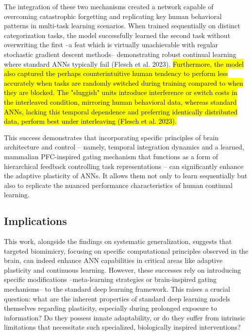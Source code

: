\documentclass[
10pt, %
a4paper, %
oneside, %
headinclude,footinclude, %
BCOR5mm, %
]{scrartcl}
\begin{document}
The integration of these two mechanisms created a network capable of overcoming catastrophic forgetting and replicating key human behavioral patterns in multi-task learning scenarios. When trained sequentially on distinct categorization tasks, the model successfully learned the second task without overwriting the first –a feat which is virtually unachievable with regular stochastic gradient descent methods– demonstrating robust continual learning where standard ANNs typically fail (Flesch et al. 2023). \hl{Furthermore, the model also captured the perhaps counterintuitive human tendency to perform less accurately when tasks are randomly switched during training compared to when they are blocked. The "sluggish" units introduce interference or switch costs in the interleaved condition, mirroring human behavioral data, whereas standard ANNs, lacking this temporal dependence and preferring identically distributed data, perform best under interleaving (Flesch et al. 2023).}

This success demonstrates that incorporating specific principles of brain architecture and control – namely, temporal integration dynamics and a learned, mammalian PFC-inspired gating mechanism that functions as a form of hierarchical feedback controlling task representations – can significantly enhance the adaptive plasticity of ANNs. It allows them not only to learn sequentially but also to replicate the nuanced performance characteristics of human continual learning.

\subsection{Implications}

This work, alongside the findings on systematic generalization, suggests that targeted biomimicry, focusing on specific computational principles observed in the brain, can indeed enhance ANN capabilities in critical areas like adaptive plasticity and continuous learning. However, these successes rely on introducing specific modifications –meta-learning strategies or brain-inspired gating mechanisms– to the standard deep learning framework. This raises a crucial question: what are the inherent properties of standard deep learning models themselves regarding plasticity, especially during prolonged exposure to information? Do they possess innate adaptability, or do they suffer from intrinsic limitations that necessitate such specialized, biologically inspired interventions?

\end{document}
